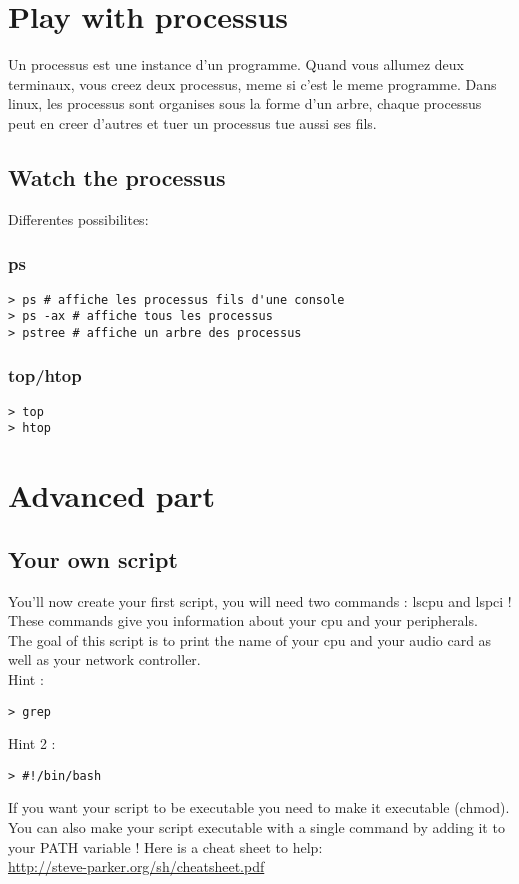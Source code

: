\documentclass[a4paper]{article}
\begin{document}
\section{Play with processus}
Un processus est une instance d'un programme. Quand vous allumez deux terminaux,
vous creez deux processus, meme si c'est le meme programme. Dans linux, les
processus sont organises sous la forme d'un arbre, chaque processus peut en
creer d'autres et tuer un processus tue aussi ses fils.
\subsection{Watch the processus}
Differentes possibilites:
\subsubsection{ps}
\begin{lstlisting}
> ps # affiche les processus fils d'une console
> ps -ax # affiche tous les processus
> pstree # affiche un arbre des processus
\end{lstlisting}
\subsubsection{top/htop}
\begin{lstlisting}
> top
> htop
\end{lstlisting}
\section{Advanced part}

\subsection{Your own script}
You'll now create your first script, you will need two commands : lscpu and lspci !\\
These commands give you information about your cpu and your peripherals.\\
The goal of this script is to print the name of your cpu and your audio card as well as your network controller.\\
Hint : 
\begin{lstlisting}
> grep 
\end{lstlisting}
Hint 2 : 
\begin{lstlisting}
> #!/bin/bash
\end{lstlisting}
If you want your script to be executable you need to make it executable (chmod).\\
You can also make your script executable with a single command by adding it to your PATH variable !
Here is a cheat sheet to help: \\
\url{http://steve-parker.org/sh/cheatsheet.pdf}
\end{document}

